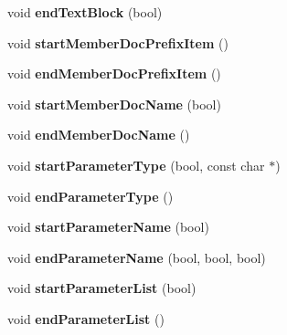 \begin{DoxyCompactItemize}
void {\bfseries end\+Text\+Block} (bool)
\item 
\mbox{\label{class_latex_generator_a6d8f9a15963805434419a016ffbe9219}} 
void {\bfseries start\+Member\+Doc\+Prefix\+Item} ()
\item 
\mbox{\label{class_latex_generator_a17d04d4fbf1106ab3e32053830b65a55}} 
void {\bfseries end\+Member\+Doc\+Prefix\+Item} ()
\item 
\mbox{\label{class_latex_generator_a766f5d12e18478011232ee61c796f019}} 
void {\bfseries start\+Member\+Doc\+Name} (bool)
\item 
\mbox{\label{class_latex_generator_a713efa446810af93ba9b8c3aaf91117c}} 
void {\bfseries end\+Member\+Doc\+Name} ()
\item 
\mbox{\label{class_latex_generator_a90a51ed6c4e424d3cf86ff1d61e8126c}} 
void {\bfseries start\+Parameter\+Type} (bool, const char $\ast$)
\item 
\mbox{\label{class_latex_generator_a65c0693470afbba9f9cb4c013e3029cc}} 
void {\bfseries end\+Parameter\+Type} ()
\item 
\mbox{\label{class_latex_generator_a6491b06249ad6fba41a74ef88392abe9}} 
void {\bfseries start\+Parameter\+Name} (bool)
\item 
\mbox{\label{class_latex_generator_a01834cb7728e046c253ab8a86efbfdb1}} 
void {\bfseries end\+Parameter\+Name} (bool, bool, bool)
\item 
\mbox{\label{class_latex_generator_a43b8d2c9eaee906a8db13b6191a774b1}} 
void {\bfseries start\+Parameter\+List} (bool)
\item 
\mbox{\label{class_latex_generator_a1fc0b7df8467ffd55521e9dfeceaf280}} 
void {\bfseries end\+Parameter\+List} ()
\item 
\mbox{\label{class_latex_generator_aefc737619fba908076b28515814983a2}} 

\end{DoxyCompactItemize}
